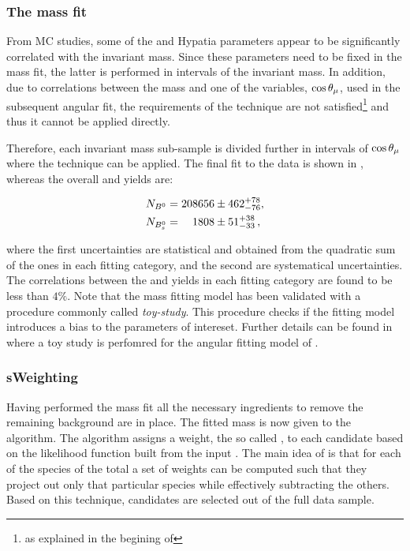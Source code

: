 \subsubsection{The mass fit}
From MC studies, some of the \Bs and \Bd Hypatia parameters appear to be significantly correlated with the \mkpi invariant mass.
Since these parameters need to be fixed in the mass fit, the latter is performed in intervals of the
\mkpi invariant mass. In addition, due to correlations between the mass and one of the variables, $\cos\theta_{\mu}$, used in
the subsequent angular fit, the requirements of the \sPlot technique are not satisfied\footnote{as explained in the begining
of } and thus it cannot be applied directly.

Therefore, each \mkpi invariant mass sub-sample is divided further in intervals of $\cos\theta_{\mu}$ where the \sPlot technique
can be applied. The final fit to the data is shown in , whereas the overall \Bs and \Bd yields are:

\begin{align}
  \centering
  N_{\Bd} &= 208656  \pm  462 ^{+ 78}_{-76}, \\
  N_{\Bs} &= \phantom{00}1808  \pm  51 ^{+ 38}_{-33} \, ,
  \label{signal_yields}
\end{align}

\noindent where the first uncertainties are statistical and obtained from the quadratic sum of the ones in each fitting category,
and the second are systematical uncertainties. The correlations between the \Bd and \Bs yields in each fitting category
are found to be less than $4\%$. Note that the mass fitting model has been validated with a procedure commonly called {\it toy-study}.
This procedure checks if the fitting model introduces a bias to the parameters of intereset. Further details can be found in
 where a toy study is perfomred for the angular fitting model of .

\subsubsection{sWeighting}
Having performed the mass fit all the necessary ingredients to remove the remaining background are in place.
The fitted mass \pdf is now given to the \sPlot algorithm. The algorithm assigns a weight, the so called \sWeight, to each candidate
based on the likelihood function built from the input \pdf. The main idea of \sPlot is that for each of the species of the total
\pdf a set of weights can be computed such that they project out only that particular species while effectively subtracting the others.
Based on this technique, \BsJpsiKst candidates are selected out of the full data sample.

